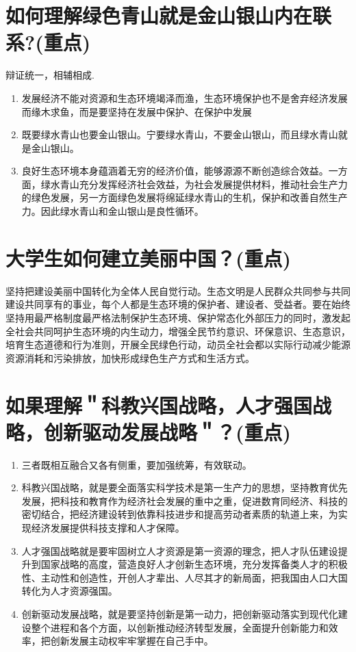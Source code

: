 \documentclass[12pt, a4paper, oneside]{ctexbook}
\begin{document}
\section{如何理解绿色青山就是金山银山内在联系?(重点)}

辩证统一，相辅相成.
\begin{enumerate}
\item 发展经济不能对资源和生态环境竭泽而渔，生态环境保护也不是舍弃经济发展而缘木求鱼，而是要坚持在发展中保护、在保护中发展

\item 既要绿水青山也要金山银山。宁要绿水青山，不要金山银山，而且绿水青山就是金山银山。

\item 良好生态环境本身蕴涵着无穷的经济价值，能够源源不断创造综合效益。一方面，绿水青山充分发挥经济社会效益，为社会发展提供材料，推动社会生产力的绿色发展，另一方面绿色发展将绵延绿水青山的生机，保护和改善自然生产力。因此绿水青山和金山银山是良性循环。
\end{enumerate}


\section{大学生如何建立美丽中国？(重点)}

坚持把建设美丽中国转化为全体人民自觉行动。生态文明是人民群众共同参与共同建设共同享有的事业，每个人都是生态环境的保护者、建设者、受益者。要在始终坚持用最严格制度最严格法制保护生态环境、保护常态化外部压力的同时，激发起全社会共同呵护生态环境的内生动力，增强全民节约意识、环保意识、生态意识，培育生态道德和行为准则，开展全民绿色行动，动员全社会都以实际行动减少能源资源消耗和污染排放，加快形成绿色生产方式和生活方式。


\section{如果理解＂科教兴国战略，人才强国战略，创新驱动发展战略＂？(重点)}

\begin{enumerate}
\item 三者既相互融合又各有侧重，要加强统筹，有效联动。

\item 科教兴国战略，就是要全面落实科学技术是第一生产力的思想，坚持教育优先发展，把科技和教育作为经济社会发展的重中之重，促进数育同经济、科技的密切结合，把经济建设转到依靠科技进步和提高劳动者素质的轨道上来，为实现经济发展提供科技支撑和人才保障。

\item 人才强国战略就是要牢固树立人才资源是第一资源的理念，把人才队伍建设提升到国家战略的高度，营造良好人才创新生态环境，充分发挥备类人才的积极性、主动性和创造性，开创人才辈出、人尽其才的新局面，把我国由人口大国转化为人才资源强国。

\item 创新驱动发展战略，就是要坚持创新是第一动力，把创新驱动落实到现代化建设整个进程和各个方面，以创新推动经济转型发展，全面提升创新能力和效率，把创新发展主动权牢牢掌握在自己手中。
\end{enumerate}
\end{document}

